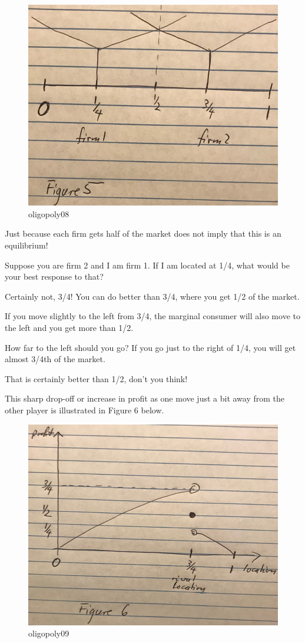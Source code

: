 \documentclass[
]{book}
\begin{document}
\begin{figure}

{\centering \includegraphics[width=0.5\linewidth]{img/oligopoly/fig8} 

}

\caption{oligopoly08}\label{fig:oligopoly08}
\end{figure}

Just because each firm gets half of the market does not imply that this is an equilibrium!

Suppose you are firm 2 and I am firm 1. If I am located at 1/4, what would be your best response to that?

Certainly not, 3/4! You can do better than 3/4, where you get 1/2 of the market.

If you move slightly to the left from 3/4, the marginal consumer will also move to the left and you get more than 1/2.

How far to the left should you go? If you go just to the right of 1/4, you will get almost 3/4th of the market.

That is certainly better than 1/2, don't you think!

This sharp drop-off or increase in profit as one move just a bit away from the other player is illustrated in Figure 6 below.

\begin{figure}

{\centering \includegraphics[width=0.5\linewidth]{img/oligopoly/fig9} 

}

\caption{oligopoly09}\label{fig:oligopoly09}
\end{figure}
\end{document}
